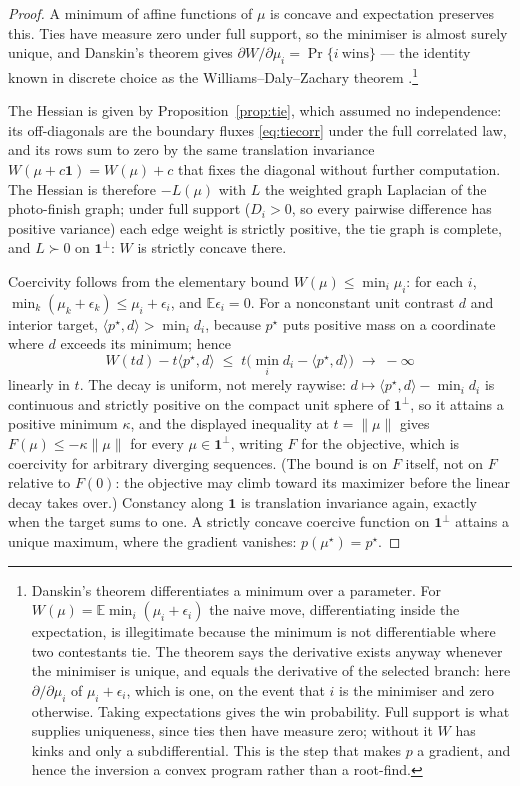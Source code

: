 \documentclass[11pt]{article}
\newcommand{\E}{\mathbb{E}}
\begin{document}
\begin{proof}
A minimum of affine functions of $\mu$ is concave and expectation
preserves this. Ties have measure zero under full support, so the
minimiser is almost surely unique, and Danskin's theorem
\citep{danskin1966} gives
$\partial W/\partial\mu_i=\Pr\{i\ \text{wins}\}$ --- the identity known
in discrete choice as the Williams--Daly--Zachary theorem
\citep{mcfadden1981}.\footnote{Danskin's
theorem differentiates a minimum over a parameter. For
$W(\mu)=\E\min_i(\mu_i+\epsilon_i)$ the naive move, differentiating
inside the expectation, is illegitimate because the minimum is not
differentiable where two contestants tie. The theorem says the
derivative exists anyway whenever the minimiser is unique, and equals the
derivative of the selected branch: here $\partial/\partial\mu_i$ of
$\mu_i+\epsilon_i$, which is one, on the event that $i$ is the
minimiser and zero otherwise. Taking expectations gives the win
probability. Full support is what supplies uniqueness, since ties then
have measure zero; without it $W$ has kinks and only a subdifferential.
This is the step that makes $p$ a gradient, and hence the inversion a
convex program rather than a root-find.}

The Hessian is given by Proposition~\ref{prop:tie}, which assumed no
independence: its off-diagonals are the boundary fluxes
\eqref{eq:tiecorr} under the full correlated law, and its rows sum to
zero by the same translation invariance $W(\mu+c\mathbf{1})=W(\mu)+c$
that fixes the diagonal without further computation. The Hessian is
therefore $-L(\mu)$ with $L$ the weighted graph Laplacian of the
photo-finish graph; under full support ($D_i>0$, so every pairwise difference has
positive variance) each edge weight is strictly positive, the tie graph
is complete, and $L\succ0$ on $\mathbf{1}^{\perp}$: $W$ is strictly
concave there.

Coercivity follows from the elementary bound
$W(\mu)\le\min_i\mu_i$: for each $i$,
$\min_k(\mu_k+\epsilon_k)\le\mu_i+\epsilon_i$, and $\E\epsilon_i=0$.
For a nonconstant unit contrast $d$ and interior target,
$\langle p^{\star},d\rangle>\min_i d_i$, because $p^{\star}$ puts
positive mass on a coordinate where $d$ exceeds its minimum; hence
\[
W(td)-t\langle p^{\star},d\rangle
 \;\le\; t\bigl(\min_i d_i-\langle p^{\star},d\rangle\bigr)
 \;\longrightarrow\;-\infty
\]
linearly in $t$. The decay is uniform, not merely raywise:
$d\mapsto\langle p^{\star},d\rangle-\min_i d_i$ is continuous and
strictly positive on the compact unit sphere of $\mathbf{1}^{\perp}$,
so it attains a positive minimum $\kappa$, and the displayed inequality
at $t=\lVert\mu\rVert$ gives $F(\mu)\le-\kappa\lVert\mu\rVert$ for every
$\mu\in\mathbf{1}^{\perp}$, writing $F$ for the objective, which is
coercivity for arbitrary diverging sequences. (The bound is on $F$
itself, not on $F$ relative to $F(0)$: the objective may climb toward
its maximizer before the linear decay takes over.) Constancy along
$\mathbf{1}$ is translation invariance
again, exactly when the target sums to one. A strictly concave coercive
function on $\mathbf{1}^{\perp}$ attains a unique maximum, where the
gradient vanishes: $p(\mu^{\star})=p^{\star}$.


\end{proof}
\end{document}
